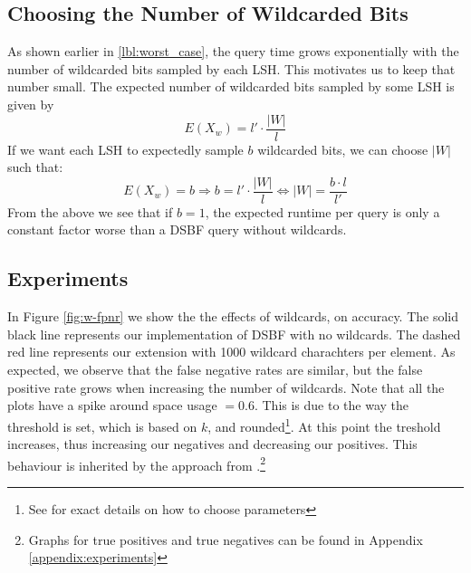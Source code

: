 \documentclass[a4paper,11pt]{article}
\begin{document}
\subsection{Choosing the Number of Wildcarded Bits}
As shown earlier in \ref{lbl:worst_case}, the query time grows exponentially with the number of wildcarded bits sampled by each LSH. This motivates us to keep that number small. The expected number of wildcarded bits sampled by some LSH is given by
\[E(X_w)=l' \cdot \frac{|W|}{l}\]
If we want each LSH to expectedly sample $b$ wildcarded bits, we can choose $|W|$ such that:
\[E(X_w)=b \Rightarrow b = l' \cdot \frac{|W|}{l} \Leftrightarrow |W| = \frac{b \cdot l}{l'}\]
From the above we see that if $b = 1$, the expected runtime per query is only a constant factor worse than a DSBF query without wildcards.


\subsection{Experiments}
In Figure \ref{fig:w-fpnr} we show the the effects of wildcards, on accuracy. The solid black line represents our implementation of DSBF with no wildcards. The dashed red line represents our extension with 1000 wildcard charachters per element. As expected, we observe that the false negative rates are similar, but the false positive rate grows when increasing the number of wildcards.  Note that all the plots have a spike around space usage $= 0.6$. This is due to the way the threshold is set, which is based on $k$, and rounded\footnote{See \cite{paper:harvard} for exact details on how to choose parameters}. At this point the treshold increases, thus increasing our negatives and decreasing our positives. This behaviour is inherited by the approach from \cite{paper:harvard}.\footnote{Graphs for true positives and true negatives can be found in Appendix \ref{appendix:experiments}}
\end{document}
